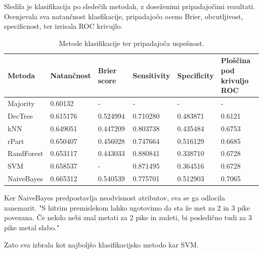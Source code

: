 \documentclass[a4paper,11pt]{article}
\begin{document}
Sledila je klasifikacija po sledečih metodah, z doseženimi pripadajočimi 
rezultati. Ocenjevala sva natančnost klasfikacije, pripadajočo oceno Brier, 
obcutljivost, specificnost, ter izrisala ROC krivujlo.

\begin{table}[htbp]
\caption{Metode klasifikacije ter pripadajoča uspešnost.}
\label{tab1}
\begin{center}
\begin{tabular}{lllllp{3cm}}
\hline
Metoda & Natančnost & Brier score & Sensitivity & Specificity & Ploščina pod krivuljo ROC\\
\hline
Majority & 0.60132 & - & - & - & - \\
\hline
DecTree & 0.615176 & 0.524994 & 0.710280 & 0.483871 & 0.6121 \\
kNN & 0.649051 & 0.447209 & 0.803738 & 0.435484 & 0.6753 \\
rPart & 0.650407 & 0.456028 & 0.747664 & 0.516129 & 0.6685 \\
RandForest & 0.653117 & 0.443033 & 0.880841 & 0.338710 & 0.6728 \\
SVM & 0.658537 & - & 0.871495 & 0.364516 & 0.6728 \\
NaiveBayes & 0.665312 & 0.540539 & 0.775701 & 0.512903 & 0.7065 \\
\hline
\end{tabular}
\end{center}
\end{table}

Ker NaiveBayes predpostavlja neodvisnost atributov, sva se ga odlocila zanemarit.
"S hitrim premislekom lahko ugotovimo da sta že met za 2 in 3 pike povezana. Če nekdo 
nebi znal metati za 2 pike in zadeti, bi posledično tudi za 3 pike metal slabo."

Zato sva izbrala kot najboljšo klasifikacijsko metodo kar SVM.
\end{document}
